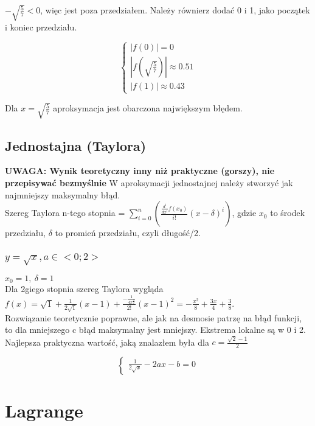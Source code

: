 \documentclass{article}
\begin{document}
$-\sqrt{\frac{5}{7}}<0$, więc jest poza przedziałem. Należy równierz dodać 0 i 1, jako początek i koniec przedziału.

\begin{equation*}\begin{cases}
    |f(0)| = 0\\
    |f(\sqrt{\frac{5}{7}})| \approx 0.51\\
    |f(1)| \approx 0.43
\end{cases}\end{equation*}

Dla $x=\sqrt{\frac{5}{7}}$ aproksymacja jest obarczona największym błędem.

\subsection{Jednostajna (Taylora)}
\textbf{UWAGA: Wynik teoretyczny inny niż praktyczne (gorszy), nie przepisywać bezmyślnie}
W aproksymacji jednostajnej należy stworzyć jak najmniejszy maksymalny błąd.\\
Szereg Taylora n-tego stopnia = $\sum_{i=0}^{n}(\frac{\frac{d^i}{dx^i}f(x_0)}{i!}(x-\delta)^i)$, gdzie $x_0$ to środek przedziału, $\delta$ to promień przedziału, czyli długość/2.

\subsubsection{$y=\sqrt{x}, a\in <0;2>$}
$x_0=1,\:\delta=1$\\
Dla 2giego stopnia szereg Taylora wygląda $f(x)=\sqrt{1}+\frac{1}{2\sqrt{1}}(x-1)+\frac{-\frac{1}{4x^\frac{3}{2}}}{2!}(x-1)^2=-\frac{x^2}{8}+\frac{3x}{4}+\frac{3}{8}$.\\
Rozwiązanie teoretycznie poprawne, ale jak na desmosie patrzę na błąd funkcji, to dla mniejszego c błąd maksymalny jest mniejszy. Ekstrema lokalne są w 0 i 2. Najlepsza praktyczna wartość, jaką znalazłem była dla $c=\frac{\sqrt{2}-1}{2}$

\begin{equation*}\begin{cases}
    \frac{1}{2\sqrt{x}}-2ax-b=0
\end{cases}\end{equation*}



\section{Lagrange}
\end{document}

